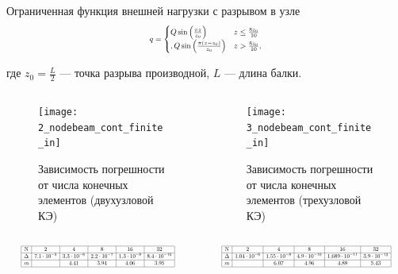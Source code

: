 \documentclass[7pt]{beamer}
\numberwithin{equation}{section}
\newcommand*{\Scale}[2][4]{\scalebox{#1}{$#2$}}
\begin{document}
\begin{frame}
	\begin{block}{Ограниченная функция внешней нагрузки с разрывом в узле}
		\begin{equation}
			\Scale[0.7]{q = 
			\begin{cases}
				Q \sin \left(\frac{\pi  z}{z_{0}}\right) & z \leq \frac{8 z_{0}}{10} \\,
				Q \sin \left(\frac{\pi  (z-z_{0})}{z_{0}}\right) & z > \frac{8 z_{0}}{10} ,
			\end{cases}
			}
		\end{equation}
	\end{block}
	где $z_{0}=\frac{L}{2}$ --- точка разрыва производной, $L$ --- длина балки. \\

		\begin{columns}
			\begin{column}{0.57\textwidth}
				\begin{figure}[H]
					\centering
					\texttt{[image: 2\_nodebeam\_cont\_finite\_in]}
					\caption{Зависимость погрешности от числа конечных элементов (двухузловой КЭ)}
					\label{fig:2_nodebeam_cont_finite_in}
				\end{figure}
			\end{column}
			\begin{column}{0.57\textwidth}
				\begin{figure}[H]
					\centering
					\texttt{[image: 3\_nodebeam\_cont\_finite\_in]}
					\caption{Зависимость погрешности от числа конечных элементов (трехузловой КЭ)}
					\label{fig:3_nodebeam_cont_finite_in}
				\end{figure}
			\end{column}
		\end{columns}
		\begin{columns}
			\begin{column}{0.5\textwidth}
				\[
					\Scale[0.5] {
							\begin{array}{|c|c|c|c|c|c|}
									\hline
									\text{N} & 2 & 4 & 8 & 16 & 32 \\ \hline
			\Delta  & 7.1 \cdot 10^{-5} & 3.3 \cdot 10^{-6} & 2.2 \cdot 10^{-7} & 1.3 \cdot 10^{-8} & 8.4 \cdot 10^{-10}\\ \hline
			m  &  & 4.41 & 3.94 & 4.06 & 3.95 \\ 
									\hline
									\end{array}
					}
				\]
			\end{column}
			\begin{column}{0.5\textwidth}
				\[
						\Scale[0.5] {
				\begin{array}{|c|c|c|c|c|c|}
				\hline
				\text{N} & 2 & 4 & 8 & 16 & 32 \\ \hline
			\Delta  & 1.04 \cdot 10^{-6} & 1.55 \cdot 10^{-8} & 4.9 \cdot 10^{-10} & 1.689 \cdot 10^{-11} & 3.9 \cdot 10^{-13} \\ \hline
			m  &  & 6.07 & 4.96 & 4.88 & 5.43 \\ 
				\hline
				\end{array}
					}
					\]
			\end{column}
		\end{columns}
	\end{frame}
\end{document}
